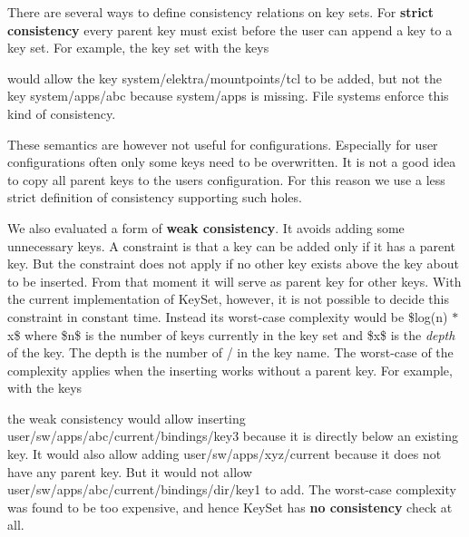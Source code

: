 There are several ways to define consistency relations on key sets. For {\bfseries{strict consistency}} every parent key must exist before the user can append a key to a key set. For example, the key set with the keys


\begin{DoxyCode}{0}
\end{DoxyCode}


would allow the key {\ttfamily system/elektra/mountpoints/tcl} to be added, but not the key {\ttfamily system/apps/abc} because {\ttfamily system/apps} is missing. File systems enforce this kind of consistency.

These semantics are however not useful for configurations. Especially for user configurations often only some keys need to be overwritten. It is not a good idea to copy all parent keys to the users configuration. For this reason we use a less strict definition of consistency supporting such holes.

We also evaluated a form of {\bfseries{weak consistency}}. It avoids adding some unnecessary keys. A constraint is that a key can be added only if it has a parent key. But the constraint does not apply if no other key exists above the key about to be inserted. From that moment it will serve as parent key for other keys. With the current implementation of {\ttfamily Key\+Set}, however, it is not possible to decide this constraint in constant time. Instead its worst-\/case complexity would be \$log(n) $\ast$ x\$ where \$n\$ is the number of keys currently in the key set and \$x\$ is the {\itshape depth} of the key. The depth is the number of {\ttfamily /} in the key name. The worst-\/case of the complexity applies when the inserting works without a parent key. For example, with the keys


\begin{DoxyCode}{0}
\end{DoxyCode}


the weak consistency would allow inserting {\ttfamily user/sw/apps/abc/current/bindings/key3} because it is directly below an existing key. It would also allow adding {\ttfamily user/sw/apps/xyz/current} because it does not have any parent key. But it would not allow {\ttfamily user/sw/apps/abc/current/bindings/dir/key1} to add. The worst-\/case complexity was found to be too expensive, and hence {\ttfamily Key\+Set} has {\bfseries{no consistency}} check at all.

